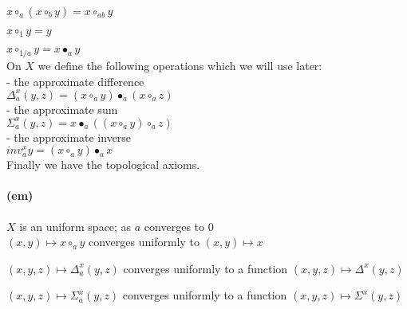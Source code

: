 \documentclass{article}
\begin{document}
      $\displaystyle x \circ_a ( x \circ_b y) = x \circ_{ab} y $
      
      $\displaystyle x \circ_1 y = y $
      
      $\displaystyle x \circ_{1/a} y = x \bullet_a y $\\


\noindent On $\displaystyle X$ we define the following operations which we will use later:\\ 

- the approximate difference \\  

$\displaystyle \Delta^{x}_{a} (y , z)  =  (x \circ_a y) \bullet_a (x \circ_a z) $\\ 

- the approximate sum \\  

$\displaystyle \Sigma^{x}_{a} (y, z) = x \bullet_{a} ( ( x \circ_{a} y) \circ_{a} z)$  \\ 

- the approximate inverse \\

$\displaystyle inv^{x}_{a} y = (x \circ_{a} y) \bullet_{a} x$ \\

\noindent Finally we have the topological axioms. 


\paragraph{(em)} $\displaystyle X$ is an uniform space; as $\displaystyle a$ converges to $\displaystyle 0$ \\

     $\displaystyle (x,y) \mapsto x \circ_a y$ converges uniformly to  $\displaystyle (x,y) \mapsto x$  

     $\displaystyle (x,y,z) \mapsto \Delta^{x}_{a} (y , z)$ converges uniformly to a function $\displaystyle (x,y,z) \mapsto \Delta^{x} (y , z)$

      $(\displaystyle x,y,z) \mapsto \Sigma^{x}_{a} (y , z)$ converges uniformly to a function $\displaystyle (x,y,z) \mapsto \Sigma^{x} (y , z)$ \\
\end{document}
